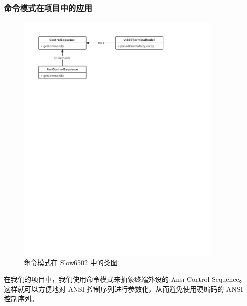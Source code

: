 \subsubsection{命令模式在项目中的应用}

\begin{figure}[h]
    \centering
    \includegraphics[width=0.9\textwidth]{figures/Command.pdf}
    \caption{命令模式在 Slow6502 中的类图}
\end{figure}

在我们的项目中，我们使用命令模式来抽象终端外设的 Ansi Control Sequence。这样就可以方便地对 ANSI 控制序列进行参数化，从而避免使用硬编码的 ANSI 控制序列。

